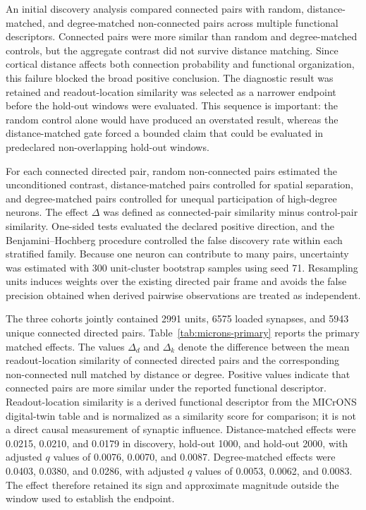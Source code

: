 \documentclass[a4paper,fleqn]{cas-sc}
\begin{document}
An initial discovery analysis compared connected pairs with random,
distance-matched, and degree-matched non-connected pairs across multiple
functional descriptors. Connected pairs were more similar than random and
degree-matched controls, but the aggregate contrast did not survive distance
matching. Since cortical distance affects both connection probability and
functional organization, this failure blocked the broad positive conclusion.
The diagnostic result was retained and readout-location similarity was selected
as a narrower endpoint before the hold-out windows were evaluated. This sequence
is important: the random control alone would have produced an overstated result,
whereas the distance-matched gate forced a bounded claim that could be
evaluated in predeclared non-overlapping hold-out windows.

For each connected directed pair, random non-connected pairs estimated the
unconditioned contrast, distance-matched pairs controlled for spatial
separation, and degree-matched pairs controlled for unequal participation of
high-degree neurons. The effect $\Delta$ was defined as connected-pair
similarity minus control-pair similarity. One-sided tests evaluated the
declared positive direction, and the Benjamini--Hochberg procedure controlled
the false discovery rate within each stratified family. Because one neuron can
contribute to many pairs, uncertainty was estimated with 300 unit-cluster
bootstrap samples using seed 71. Resampling units induces weights over the existing directed pair frame and
avoids the false precision obtained when derived pairwise observations are
treated as independent.

The three cohorts jointly contained 2991 units, 6575 loaded synapses, and 5943
unique connected directed pairs. Table~\ref{tab:microns-primary} reports the
primary matched effects. The values $\Delta_d$ and $\Delta_k$ denote the
difference between the mean readout-location similarity of connected directed
pairs and the corresponding non-connected null matched by distance or degree.
Positive values indicate that connected pairs are more similar under the
reported functional descriptor. Readout-location similarity is a derived
functional descriptor from the MICrONS digital-twin table and is normalized as
a similarity score for comparison; it is not a direct causal measurement of
synaptic influence. Distance-matched effects were 0.0215, 0.0210, and 0.0179
in discovery, hold-out 1000, and hold-out 2000, with adjusted $q$ values of
0.0076, 0.0070, and 0.0087. Degree-matched effects were 0.0403, 0.0380, and
0.0286, with adjusted $q$ values of 0.0053, 0.0062, and 0.0083. The effect
therefore retained its sign and approximate magnitude outside the window used
to establish the endpoint.
\end{document}
